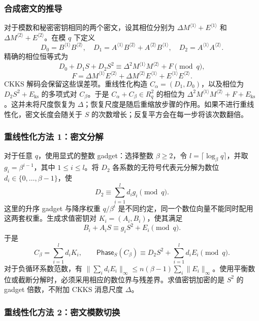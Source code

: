 \subsubsection{合成密文的推导}
\label{subsubsec:ckks-mult-cipher-relation}

对于模数和秘密密钥相同的两个密文，设其相位分别为 $\Delta M^{\langle 1\rangle}+E^{\langle 1\rangle}$ 和 $\Delta M^{\langle 2\rangle}+E^{\langle 2\rangle}$。在模 $q$ 下定义
\[
D_0=B^{\langle 1\rangle}B^{\langle 2\rangle},\quad
D_1=A^{\langle 1\rangle}B^{\langle 2\rangle}+A^{\langle 2\rangle}B^{\langle 1\rangle},\quad
D_2=A^{\langle 1\rangle}A^{\langle 2\rangle}.
\]
精确的相位恒等式为
\[
D_0+D_1S+D_2S^2\equiv\Delta^2M^{\langle 1\rangle}M^{\langle 2\rangle}+F\pmod q,
\]
\[
F=\Delta M^{\langle 1\rangle}E^{\langle 2\rangle}
+\Delta M^{\langle 2\rangle}E^{\langle 1\rangle}
+E^{\langle 1\rangle}E^{\langle 2\rangle}.
\]
CKKS 解码会保留这些误差项。重线性化构造 $C_\alpha=(D_1,D_0)$，以及相位为 $D_2S^2+E_{\mathrm{ks}}$ 的多项式对 $C_\beta$。于是 $C_\alpha+C_\beta\in R_q^2$ 的相位为 $\Delta^2M^{\langle 1\rangle}M^{\langle 2\rangle}+F+E_{\mathrm{ks}}$。这并未将尺度恢复为 $\Delta$；恢复尺度是随后重缩放步骤的作用。如果不进行重线性化，密文长度会随关于 $S$ 的次数增长；反复平方会在每一步将该次数翻倍。

\subsubsection{重线性化方法 1：密文分解}
\label{subsubsec:relinearization-gadget-decomposition}

对于任意 $q$，使用显式的整数 gadget：选择整数 $\beta\geq 2$，令 $l=\lceil\log_\beta q\rceil$，并取 $g_i=\beta^{i-1}$，其中 $1\leq i\leq l$。将 $D_2$ 各系数的无符号代表元分解为数位 $d_i\in\{0,\ldots,\beta-1\}$，使
\[
D_2\equiv\sum_{i=1}^l d_i g_i\pmod q.
\]
这里的升序 gadget 与降序权重 $q/\beta^i$ 是不同约定，同一个数位向量不能同时配用这两套权重。生成求值密钥对 $K_i=(A_i,B_i)$，使其满足
\[
B_i+A_iS\equiv g_iS^2+E_i\pmod q.
\]
于是
\[
C_\beta=\sum_{i=1}^l d_iK_i,\qquad
\mathsf{Phase}_S(C_\beta)\equiv D_2S^2+\sum_{i=1}^l d_iE_i\pmod q.
\]
对于负循环系数范数，有 $\|\sum_i d_iE_i\|_\infty\leq n(\beta-1)\sum_i\|E_i\|_\infty$。使用平衡数位或截断分解时，必须采用相应的数位界与残差界。求值密钥加密的是 $S^2$ 的 gadget 倍数，不附加 CKKS 消息尺度 $\Delta$。

\subsubsection{重线性化方法 2：密文模数切换}
\label{subsubsec:relinearization-modulus-switch}

